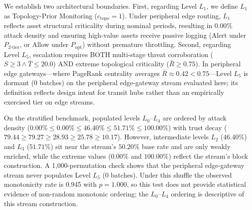 \documentclass[journal,10pt,onecolumn]{IEEEtran}
\begin{document}
We establish two architectural boundaries. First, regarding Level $L_1$, we define $L_1$ as Topology-Prior Monitoring ($c_{\text{topo}}=1$). Under peripheral edge routing, $L_1$ reflects asset structural criticality during nominal periods, resulting in 0.00\% attack density and ensuring high-value assets receive passive logging (Alert under $P_{2\text{-tier}}$, or Allow under $P_{\text{opt}}$) without premature throttling. Second, regarding Level $L_5$, escalation requires BOTH multi-stage threat corroboration ($S \ge 3 \land \bar{T} \le 20.0$) AND extreme topological criticality ($\bar{R} \ge 0.75$). In peripheral edge gateways---where PageRank centrality averages $\bar{R} \approx 0.42 < 0.75$---Level $L_5$ is dormant (0 batches) on the peripheral edge-gateway stream evaluated here; its definition reflects design intent for transit hubs rather than an empirically exercised tier on edge streams.

On the stratified benchmark, populated levels $L_0$--$L_4$ are ordered by attack density ($0.00\% \le 0.00\% \le 46.40\% \le 51.71\% \le 100.00\%$) with trust decay ($79.44 \ge 79.27 \ge 28.93 \ge 25.78 \ge 10.17$). However, intermediate levels $L_2$ ($46.40\%$) and $L_3$ ($51.71\%$) sit near the stream's $50.20\%$ base rate and are only weakly enriched, while the extreme values ($0.00\%$ and $100.00\%$) reflect the stream's block construction. A 1,000-permutation check shows that the peripheral edge-gateway stream never populates Level $L_5$ (0 batches). Under this shuffle the observed monotonicity rate is 0.945 with $p = 1.000$, so this test does not provide statistical evidence of non-random monotonic ordering; the $L_0$--$L_4$ ordering is descriptive of this stream construction.
\end{document}
